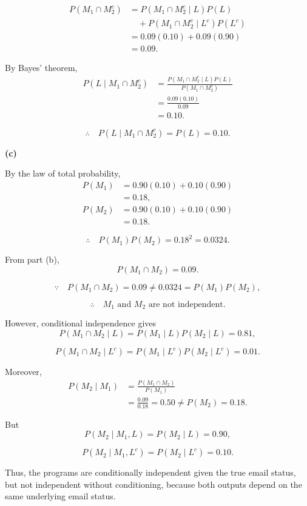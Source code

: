\documentclass[11pt,a4paper]{article}
\begin{document}
\begin{align*}
P(M_1\cap M_2^c)
&=P(M_1\cap M_2^c\mid L)P(L)\\
&\quad+P(M_1\cap M_2^c\mid L^c)P(L^c)\\
&=0.09(0.10)+0.09(0.90)\\
&=0.09.
\end{align*}

By Bayes' theorem,
\begin{align*}
P(L\mid M_1\cap M_2^c)
&=\frac{P(M_1\cap M_2^c\mid L)P(L)}
{P(M_1\cap M_2^c)}\\
&=\frac{0.09(0.10)}{0.09}\\
&=0.10.
\end{align*}

\[
\therefore\quad
P(L\mid M_1\cap M_2^c)=P(L)=0.10.
\]


\bigskip
\noindent
\textbf{(c)}

By the law of total probability,
\begin{align*}
P(M_1)
&=0.90(0.10)+0.10(0.90)\\
&=0.18,\\[4pt]
P(M_2)
&=0.90(0.10)+0.10(0.90)\\
&=0.18.
\end{align*}

\[
\therefore\quad
P(M_1)P(M_2)=0.18^2=0.0324.
\]

From part (b),
\[
P(M_1\cap M_2)=0.09.
\]

\[
\because\quad
P(M_1\cap M_2)=0.09
\neq 0.0324=P(M_1)P(M_2),
\]

\[
\therefore\quad
M_1\text{ and }M_2\text{ are not independent.}
\]

However, conditional independence gives
\[
P(M_1\cap M_2\mid L)
=P(M_1\mid L)P(M_2\mid L)
=0.81,
\]

\[
P(M_1\cap M_2\mid L^c)
=P(M_1\mid L^c)P(M_2\mid L^c)
=0.01.
\]

Moreover,
\begin{align*}
P(M_2\mid M_1)
&=\frac{P(M_1\cap M_2)}{P(M_1)}\\
&=\frac{0.09}{0.18}=0.50
\neq P(M_2)=0.18.
\end{align*}

But
\[
P(M_2\mid M_1,L)=P(M_2\mid L)=0.90,
\]

\[
P(M_2\mid M_1,L^c)=P(M_2\mid L^c)=0.10.
\]

Thus, the programs are conditionally independent
given the true email status, but not independent
without conditioning, because both outputs depend
on the same underlying email status.
\end{document}
